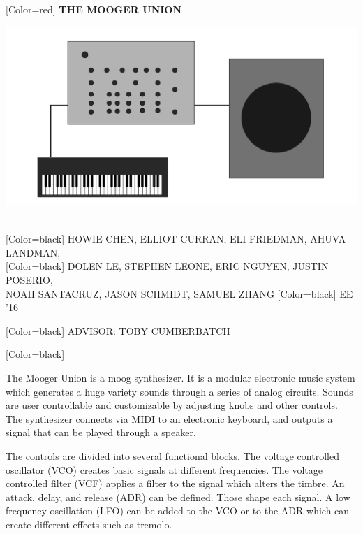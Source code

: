 \documentclass{article}
\begin{document}
\begin{minipage}[c]{20in}
{ 
[Color=red]
\fontsize{2.25in}{0.8in}\selectfont 
\bfseries
THE MOOGER UNION
}
\end{minipage}

\begin{minipage}{21in}
\centering
\includegraphics[width=20in]{figure.png}
\end{minipage}
\vspace{1in}\\
{
[Color=black]
\fontsize{0.9in}{1em}\selectfont 
HOWIE CHEN, ELLIOT CURRAN, ELI FRIEDMAN, AHUVA LANDMAN,\vspace{0.25in}\\ 
}
{
[Color=black]
\fontsize{0.9in}{1em}\selectfont 
DOLEN LE, STEPHEN LEONE,
ERIC NGUYEN, JUSTIN POSERIO,\vspace{0.25in}\\ NOAH SANTACRUZ, JASON SCHMIDT, SAMUEL ZHANG
}
{
[Color=black]
\fontsize{0.8in}{1em}\selectfont 
EE '16
}
\vspace{0.25in}

{
[Color=black]
\fontsize{0.8in}{1em}\selectfont 
\noindent ADVISOR: TOBY CUMBERBATCH
}
\vspace{0.8in}\\
\begin{minipage}{16in}
{
	[Color=black]
	\fontsize{0.6in}{6.5em}\selectfont

	The Mooger Union is a moog synthesizer. It is a modular electronic music system
	which generates a huge variety sounds through a series of analog circuits. Sounds are user
	controllable and customizable by adjusting knobs and other controls. The synthesizer
	connects via MIDI to an electronic keyboard, and outputs a signal that can be played through
	a speaker.

	\vspace{0.5in}

	The controls are divided into several functional blocks. The voltage controlled oscillator
	(VCO) creates basic signals at different frequencies. The voltage controlled filter (VCF)
	applies a filter to the signal which alters the timbre. An attack, delay, and release (ADR) can
	be defined. Those shape each signal. A low frequency oscillation (LFO) can be added to the
	VCO or to the ADR which can create different effects such as tremolo.


} \end{minipage} 
\end{document}

